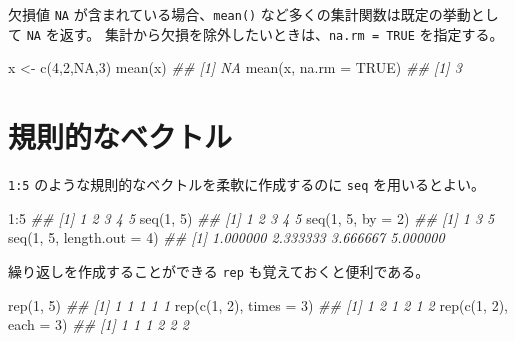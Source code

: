 \documentclass[
  letterpaper,
  xelatex,
  ja=standard, xelatex]{bxjsbook}
\newenvironment{Shaded}{\begin{snugshade}}{\end{snugshade}}
\newcommand{\AttributeTok}[1]{\textcolor[rgb]{0.40,0.45,0.13}{#1}}
\newcommand{\ConstantTok}[1]{\textcolor[rgb]{0.56,0.35,0.01}{#1}}
\newcommand{\DecValTok}[1]{\textcolor[rgb]{0.68,0.00,0.00}{#1}}
\newcommand{\DocumentationTok}[1]{\textcolor[rgb]{0.37,0.37,0.37}{\textit{#1}}}
\newcommand{\FunctionTok}[1]{\textcolor[rgb]{0.28,0.35,0.67}{#1}}
\newcommand{\NormalTok}[1]{\textcolor[rgb]{0.00,0.23,0.31}{#1}}
\newcommand{\OtherTok}[1]{\textcolor[rgb]{0.00,0.23,0.31}{#1}}
\newcommand{\SpecialCharTok}[1]{\textcolor[rgb]{0.37,0.37,0.37}{#1}}
\begin{document}
欠損値 \texttt{NA} が含まれている場合、\texttt{mean()}
など多くの集計関数は既定の挙動として \texttt{NA} を返す。
集計から欠損を除外したいときは、\texttt{na.rm\ =\ TRUE} を指定する。

\begin{Shaded}
\begin{Highlighting}[]
\NormalTok{x }\OtherTok{\textless{}{-}} \FunctionTok{c}\NormalTok{(}\DecValTok{4}\NormalTok{,}\DecValTok{2}\NormalTok{,}\ConstantTok{NA}\NormalTok{,}\DecValTok{3}\NormalTok{)}
\FunctionTok{mean}\NormalTok{(x)}
\DocumentationTok{\#\# [1] NA}
\FunctionTok{mean}\NormalTok{(x, }\AttributeTok{na.rm =} \ConstantTok{TRUE}\NormalTok{)}
\DocumentationTok{\#\# [1] 3}
\end{Highlighting}
\end{Shaded}

\section{規則的なベクトル}\label{ux898fux5247ux7684ux306aux30d9ux30afux30c8ux30eb}

\texttt{1:5} のような規則的なベクトルを柔軟に作成するのに \texttt{seq}
を用いるとよい。

\begin{Shaded}
\begin{Highlighting}[]
\DecValTok{1}\SpecialCharTok{:}\DecValTok{5}
\DocumentationTok{\#\# [1] 1 2 3 4 5}
\FunctionTok{seq}\NormalTok{(}\DecValTok{1}\NormalTok{, }\DecValTok{5}\NormalTok{)}
\DocumentationTok{\#\# [1] 1 2 3 4 5}
\FunctionTok{seq}\NormalTok{(}\DecValTok{1}\NormalTok{, }\DecValTok{5}\NormalTok{, }\AttributeTok{by =} \DecValTok{2}\NormalTok{)}
\DocumentationTok{\#\# [1] 1 3 5}
\FunctionTok{seq}\NormalTok{(}\DecValTok{1}\NormalTok{, }\DecValTok{5}\NormalTok{, }\AttributeTok{length.out =} \DecValTok{4}\NormalTok{)}
\DocumentationTok{\#\# [1] 1.000000 2.333333 3.666667 5.000000}
\end{Highlighting}
\end{Shaded}

繰り返しを作成することができる \texttt{rep} も覚えておくと便利である。

\begin{Shaded}
\begin{Highlighting}[]
\FunctionTok{rep}\NormalTok{(}\DecValTok{1}\NormalTok{, }\DecValTok{5}\NormalTok{)}
\DocumentationTok{\#\# [1] 1 1 1 1 1}
\FunctionTok{rep}\NormalTok{(}\FunctionTok{c}\NormalTok{(}\DecValTok{1}\NormalTok{, }\DecValTok{2}\NormalTok{), }\AttributeTok{times =} \DecValTok{3}\NormalTok{)}
\DocumentationTok{\#\# [1] 1 2 1 2 1 2}
\FunctionTok{rep}\NormalTok{(}\FunctionTok{c}\NormalTok{(}\DecValTok{1}\NormalTok{, }\DecValTok{2}\NormalTok{), }\AttributeTok{each =} \DecValTok{3}\NormalTok{)}
\DocumentationTok{\#\# [1] 1 1 1 2 2 2}
\end{Highlighting}
\end{Shaded}
\end{document}
